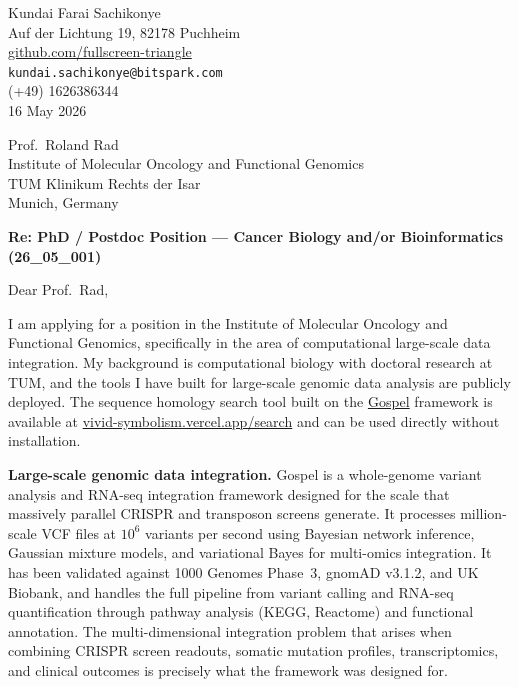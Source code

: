 \documentclass[12pt,a4paper]{article}
\begin{document}
\begin{flushright}
Kundai Farai Sachikonye \\
Auf der Lichtung 19, 82178 Puchheim \\
\href{https://github.com/fullscreen-triangle}{github.com/fullscreen-triangle} \\
\texttt{kundai.sachikonye@bitspark.com} \\
(+49) 1626386344 \\[6pt]
16 May 2026
\end{flushright}

\vspace{1em}

Prof.\ Roland Rad \\
Institute of Molecular Oncology and Functional Genomics \\
TUM Klinikum Rechts der Isar \\
Munich, Germany

\vspace{1.5em}

\textbf{Re: PhD / Postdoc Position --- Cancer Biology and/or Bioinformatics (26\_05\_001)}

\vspace{1em}

Dear Prof.\ Rad,

I am applying for a position in the Institute of Molecular Oncology and Functional
Genomics, specifically in the area of computational large-scale data integration.
My background is computational biology with doctoral research at TUM, and the tools
I have built for large-scale genomic data analysis are publicly deployed.
The sequence homology search tool built on the
\href{https://github.com/fullscreen-triangle/gospel}{Gospel} framework is available at
\href{https://vivid-symbolism.vercel.app/search}{vivid-symbolism.vercel.app/search}
and can be used directly without installation.

\textbf{Large-scale genomic data integration.}
Gospel is a whole-genome variant analysis and RNA-seq integration framework designed
for the scale that massively parallel CRISPR and transposon screens generate.
It processes million-scale VCF files at $10^6$ variants per second using Bayesian
network inference, Gaussian mixture models, and variational Bayes for multi-omics
integration. It has been validated against 1000 Genomes Phase~3, gnomAD v3.1.2,
and UK Biobank, and handles the full pipeline from variant calling and RNA-seq
quantification through pathway analysis (KEGG, Reactome) and functional annotation.
The multi-dimensional integration problem that arises when combining CRISPR screen
readouts, somatic mutation profiles, transcriptomics, and clinical outcomes is
precisely what the framework was designed for.
\end{document}
